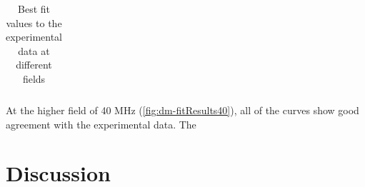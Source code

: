 \begin{table}
{\begin{tabular}{l|ccc|ccc|}
\end{tabular}
}
\caption{Best fit values to the experimental data at different fields}
\label{tab:dm-fitPars}
\end{table}
At the higher field of 40 MHz (\autoref{fig:dm-fitResults40}), all of the curves show good agreement with the experimental data. The

\section{Discussion}
